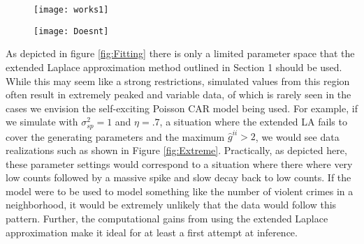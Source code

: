 \documentclass[11pt]{isuthesis}
\begin{document}
		\begin{figure}[!htp]
			\centering
				\texttt{[image: works1]}
				\label{fig:gii terms}
			\end{figure}
			\begin{figure}[!htp]
				\centering
				\texttt{[image: Doesnt]}
			\label{fig:gii terms2}
		\end{figure}
	
	
	
	As depicted in figure \ref{fig:Fitting} there is only a limited parameter space that the extended Laplace approximation method outlined in Section 1 should be used.  While this may seem like a strong restrictions, simulated values from this region often result in extremely peaked and variable data, of which is rarely seen in the cases we envision the self-exciting Poisson CAR model being used.  For example, if we simulate with $\sigma_{sp}^2=1$ and $\eta=.7$, a situation where the extended LA fails to cover the generating parameters and the maximum $\hat{g}^{ii}>2$, we would see data realizations such as shown in Figure \ref{fig:Extreme}.  Practically, as depicted here, these parameter settings would correspond to a situation where there where very low counts followed by a massive spike and slow decay back to low counts.  If the model were to be used to model something like the number of violent crimes in a neighborhood, it would be extremely unlikely that the data would follow this pattern.  Further, the computational gains from using the extended Laplace approximation make it ideal for at least a first attempt at inference.
	
\end{document}
